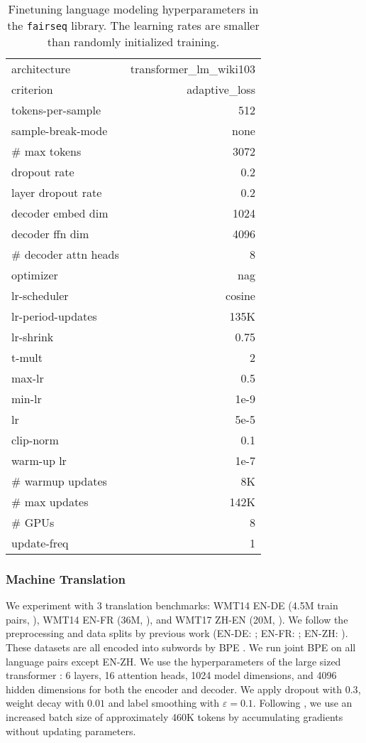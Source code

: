 \documentclass[11pt]{article}
\begin{document}
\begin{table}[h]
\small
\centering
\begin{tabular}{ |l r|}
\hline
architecture & transformer\_lm\_wiki103\\
criterion & adaptive\_loss \\
tokens-per-sample & 512 \\
sample-break-mode & none \\
\# max tokens & 3072\\
dropout rate & 0.2\\
layer dropout rate & 0.2\\
decoder embed dim  & 1024\\
decoder ffn dim  & 4096\\
\# decoder attn heads & 8\\
optimizer &  nag \\
lr-scheduler &  cosine \\
lr-period-updates &  135K \\
lr-shrink & 0.75 \\
t-mult & 2 \\
max-lr & 0.5 \\
min-lr & 1e-9 \\
lr &  5e-5 \\
clip-norm & 0.1\\
warm-up lr & 1e-7 \\
\# warmup updates & 8K \\
\# max updates &  142K \\
\# GPUs & 8 \\
update-freq & 1\\
\hline
\end{tabular}
\caption{Finetuning language modeling hyperparameters in the \texttt{fairseq} library. The learning rates are smaller than randomly initialized training.}
\label{tab:lm-ft-hyp}
\end{table}

\subsubsection{Machine Translation}
We experiment with 3 translation benchmarks: WMT14 EN-DE (4.5M train pairs, \citealp{wmt2016-findings}), WMT14 EN-FR (36M, \citealp{wmt2014-findings}), and WMT17 ZH-EN (20M, \citealp{wmt2017-findings}).
We follow the preprocessing and data splits by previous work (EN-DE: \citealp{Vaswani2017AttentionIA}; EN-FR: \citealp{Gehring2017ConvolutionalST}; EN-ZH: \citealp{Hassan2018AchievingHP, wu2018pay}).
These datasets are all encoded into subwords by BPE \cite{sennrich-etal-2016-neural}.
We run joint BPE on all language pairs except EN-ZH.
We use the hyperparameters of the large sized transformer \cite{Vaswani2017AttentionIA}: 6 layers, 16 attention heads, 1024 model dimensions, and 4096 hidden dimensions for both the encoder and decoder.
We apply dropout with $0.3$, weight decay with $0.01$ and label smoothing with $\varepsilon=0.1$.
Following \citet{Ott2018ScalingNM}, we use an increased batch size of approximately 460K tokens by accumulating gradients without updating parameters.
\end{document}
